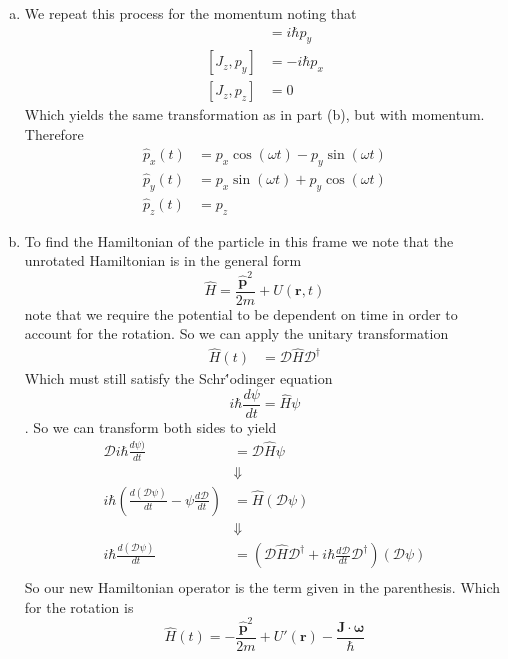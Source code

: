 \documentclass[11pt]{article}
\numberwithin{equation}{section}
\begin{document}
\begin{enumerate}[(a)]
\item We repeat this process for the momentum noting that 
\begin{align*}
[J_z,p_x] &= i\hbar p_y\\
[J_z,p_y] &= -i\hbar p_x\\
[J_z,p_z] &= 0
\end{align*}
Which yields the same transformation as in part (b), but with momentum. Therefore
\begin{align*}
\hat{p}_x(t) &= p_x\cos(\omega{t}) - p_y\sin(\omega{t})\\
\hat{p}_y(t) &= p_x\sin(\omega{t}) + p_y\cos(\omega{t})\\
\hat{p}_z(t) &= p_z
\end{align*}

\item To find the Hamiltonian of the particle in this frame we note that the unrotated 
Hamiltonian is in the general form 
$$\hat{H} = \frac{\hat{\mathbf{p}}^2}{2m} + U(\mathbf{r},t)$$
note that we require the potential to be dependent on time in order to account for the 
rotation. So we can apply the unitary transformation 
\begin{align*}
\hat{H}(t) &= \mathscr{D}\hat{H}\mathscr{D}^{\dagger}
\end{align*}
Which must still satisfy the Schr\''{o}dinger equation
$$i\hbar\frac{d\psi}{dt} = \hat{H}\psi$$
. So we can transform both sides to yield
\begin{align*}
\mathscr{D}i\hbar\frac{d\psi)}{dt} &= \mathscr{D}\hat{H}\psi\\
&\Downarrow\\
i\hbar\left(\frac{d(\mathscr{D}\psi)}{dt} - \psi\frac{d\mathscr{D}}{dt}\right) &= \hat{H}(\mathscr{D}\psi)\\
&\Downarrow\\
i\hbar\frac{d(\mathscr{D}\psi)}{dt} &=\left(\mathscr{D}\hat{H}\mathscr{D}^{\dagger} + i\hbar\frac{d\mathscr{D}}{dt}\mathscr{D}^{\dagger}\right)(\mathscr{D}\psi)\\
\end{align*}
So our new Hamiltonian operator is the term given in the parenthesis. Which for the rotation is
$$\hat{H}(t) = -\frac{\hat{\mathbf{p}}^2}{2m} + U'(\mathbf{r}) - \frac{\mathbf{J}\cdot\pmb{\omega}}{\hbar}$$


\end{enumerate}
\end{document}

